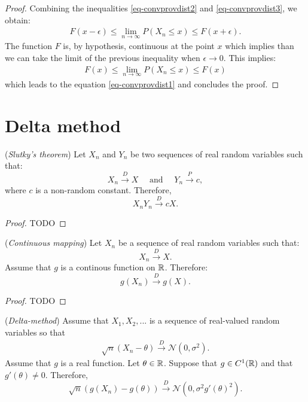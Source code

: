 \documentclass{article}
\begin{document}
\begin{proof}
Combining the inequalities \ref{eq-convprovdist2} and \ref{eq-convprovdist3}, we obtain: 
\begin{align*}
F(x-\epsilon) \leq \lim_{n\rightarrow \infty} P(X_n\leq x)  \leq F(x+\epsilon).
\end{align*}
The function $F$ is, by hypothesis, continuous at the point $x$ which implies than we can take 
the limit of the previous inequality when $\epsilon\rightarrow 0$. 
This implies:
\begin{align*}
F(x) \leq \lim_{n\rightarrow \infty} P(X_n\leq x)  \leq F(x)
\end{align*}
which leads to the equation \ref{eq-convprovdist1} and concludes the proof.

\end{proof}


\section{Delta method}

\begin{theorem}
(\emph{Slutky's theorem})
Let $X_n$ and $Y_n$ be two sequences of real random variables such that:
$$
X_n \xrightarrow{D} X \quad \textrm{ and } \quad Y_n \xrightarrow{P} c,
$$
where $c$ is a non-random constant. 
Therefore, 
$$
X_n Y_n \xrightarrow{D} c X.
$$
\end{theorem}

\begin{proof}
TODO
\end{proof}


\begin{theorem}
(\emph{Continuous mapping})
Let $X_n$ be a sequence of real random variables such that:
$$
X_n \xrightarrow{D} X.
$$
Assume that $g$ is a continous function on $\mathbb{R}$. 
Therefore:
$$
g(X_n) \xrightarrow{D} g(X).
$$
\end{theorem}

\begin{proof}
TODO
\end{proof}


\begin{theorem}
(\emph{Delta-method})
Assume that $X_1,X_2,...$ is a sequence of real-valued random variables 
so that 
\begin{align}
\label{eq-delmeth1}
\sqrt{n} (X_n - \theta) \xrightarrow{D} \mathcal{N}(0,\sigma^2).
\end{align}
Assume that $g$ is a real function. 
Let $\theta\in\mathbb{R}$. 
Suppose that $g\in C^1(\mathbb{R})$ and that $g'(\theta)\neq 0$. 
Therefore, 
$$
\sqrt{n} (g(X_n) - g(\theta)) \xrightarrow{D} \mathcal{N}(0,\sigma^2 g'(\theta)^2).
$$
\end{theorem}
\end{document}
